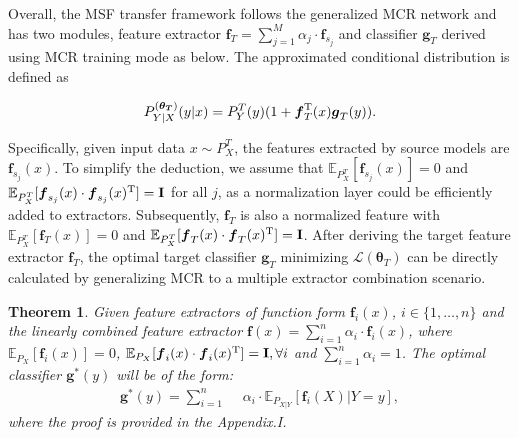 \documentclass[letterpaper]{article} %
\newtheorem{theorem}{Theorem}
\begin{document}
Overall, the MSF transfer framework follows the generalized MCR\citep{xu2020maximal} network and has two modules, feature extractor $\boldsymbol{f}_T = \sum_{j=1}^M \alpha_j \cdot \boldsymbol{f}_{s_j}$ and classifier $\boldsymbol{g}_T$ derived using MCR training mode as below. The approximated conditional distribution is defined as 


\begin{equation}
    P^{(\boldsymbol{\theta_T})}_{Y|X} (y|x) = P^T_Y(y) (1+\boldsymbol{f}_T^{\rm T}(x)\boldsymbol{g}_T(y)).
\end{equation}


Specifically, given input data $x \sim P^T_X$, the features extracted by source models are $\boldsymbol{f}_{s_j}(x)$. To simplify the deduction, we assume that $\mathbb{E}_{P^T_X}[\boldsymbol{f}_{s_j}(x)] = 0$ and $\mathbb{E}_{P^T_X}[\boldsymbol{f}_{s_j}(x)\cdot \boldsymbol{f}_{s_j}(x)^{\rm T}] = \mathbf{I}$ for all $j$, as a normalization layer could be efficiently added to extractors. Subsequently, $\boldsymbol{f}_T$ is also a normalized feature with $\mathbb{E}_{P^T_X}[\boldsymbol{f}_{T}(x)] = 0$ and $\mathbb{E}_{P^T_X}[\boldsymbol{f}_{T}(x)\cdot \boldsymbol{f}_{T}(x)^{\rm T}] = \mathbf{I}$. After deriving the target feature extractor $\boldsymbol{f}_T$, the optimal target classifier $\boldsymbol{g}_T$ minimizing $\mathcal L(\boldsymbol{\theta}_T)$ can be directly calculated by generalizing MCR to a multiple extractor combination scenario. 

\begin{theorem}
    Given feature extractors of function form $\boldsymbol{f}_{i}(x)$, $i \in \{1,\dots, n\} $ and the linearly combined feature extractor $\boldsymbol{f}(x) = \sum_{i=1}^n \alpha_i \cdot \boldsymbol{f}_i(x)$, where $\mathbb{E}_{P_X}[\boldsymbol{f}_i(x)] = 0$, $\mathbb{E}_{P_X}[\boldsymbol{f}_i(x)\cdot \boldsymbol{f}_i(x)^{\rm T}] = \mathbf{I}, \forall i$ and $\sum_{i=1}^n \alpha_i = 1$. The optimal classifier $\boldsymbol{g}^*(y)$ will be of the form:
    \begin{equation}
    \begin{aligned}
        \boldsymbol{g}^*(y) =   \sum_{i=1}^n\ \  & \alpha_i \cdot \mathbb{E}_{P_{X|Y}}[\boldsymbol{f}_i(X)|Y=y],  
    \end{aligned}
    \label{gnet}
    \end{equation}
    \label{getg}
    where the proof is provided in the Appendix.I. 
\end{theorem}
\end{document}
